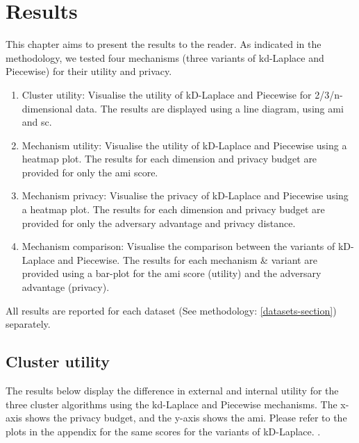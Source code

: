 \chapter{Results}
This chapter aims to present the results to the reader.
As indicated in the methodology, we tested four mechanisms (three variants of kd-Laplace and Piecewise) for their utility and privacy.
\begin{enumerate}
    \item Cluster utility: Visualise the utility of kD-Laplace and Piecewise for 2/3/n-dimensional data.
          The results are displayed using a line diagram, using \gls{ami} and \gls{sc}.
    \item Mechanism utility: Visualise the utility of kD-Laplace and Piecewise using a heatmap plot.
          The results for each dimension and privacy budget are provided for only the \gls{ami} score.
    \item Mechanism privacy: Visualise the privacy of kD-Laplace and Piecewise using a heatmap plot.
          The results for each dimension and privacy budget are provided for only the adversary advantage and privacy distance.
    \item Mechanism comparison: Visualise the comparison between the variants of kD-Laplace and Piecewise.
          The results for each mechanism \& variant are provided using a bar-plot for the \gls{ami} score (utility) and the adversary advantage (privacy).
\end{enumerate}
All results are reported for each dataset (See methodology: \ref{datasets-section}) separately.
\section{Cluster utility}
The results below display the difference in external and internal utility for the three cluster algorithms using the kd-Laplace and Piecewise mechanisms.
The x-axis shows the privacy budget, and the y-axis shows the \gls{ami}.
Please refer to the plots in the appendix for the same scores for the variants of kD-Laplace. .
\newpage
